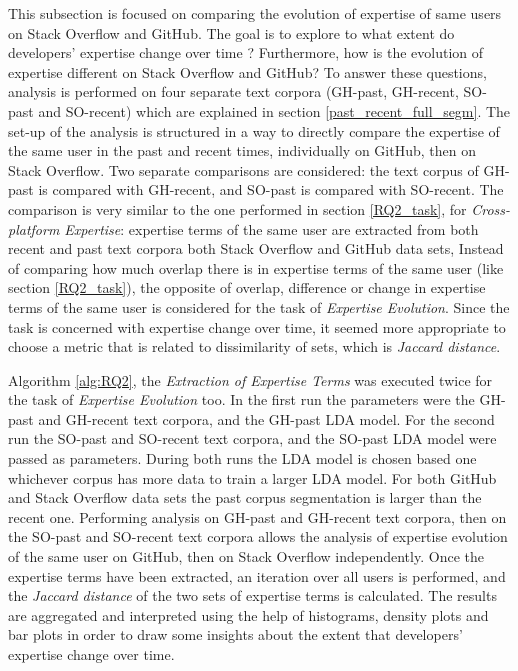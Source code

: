         This subsection is focused on comparing the evolution of expertise of same users on Stack Overflow and GitHub. The goal is to explore to what extent do developers' expertise change over time ? Furthermore, how is the evolution of expertise different on Stack Overflow and GitHub? To answer these questions, analysis is performed on four separate text corpora (GH-past, GH-recent, SO-past and SO-recent) which are explained in section \ref{past_recent_full_segm}. The set-up of the analysis is structured in a way to directly compare the expertise of the same user in the past and recent times, individually on GitHub, then on Stack Overflow. Two separate comparisons are considered: the text corpus of GH-past is compared with GH-recent, and SO-past is compared with SO-recent. The comparison is very similar to the one performed in section \ref{RQ2_task}, for \emph{Cross-platform Expertise}: expertise terms of the same user are extracted from both recent and past text corpora both Stack Overflow and GitHub data sets, Instead of comparing how much overlap there is in expertise terms of the same user (like section \ref{RQ2_task}), the opposite of overlap, difference or change in expertise terms of the same user is considered for the task of \emph{Expertise Evolution}. Since the task is concerned with expertise change over time, it seemed more appropriate to choose a metric that is related to dissimilarity of sets, which is  \emph{Jaccard distance}.
        
        Algorithm \ref{alg:RQ2}, the \emph{Extraction of Expertise Terms} was executed twice for the task of \emph{Expertise Evolution} too. In the first run the parameters were the GH-past and GH-recent text corpora, and the GH-past LDA model. For the second run the SO-past and SO-recent text corpora, and the SO-past LDA model were passed as parameters. During both runs the LDA model is chosen based one whichever corpus has more data to train a larger LDA model. For both GitHub and Stack Overflow data sets the past corpus segmentation is larger than the recent one. Performing analysis on GH-past and GH-recent text corpora, then on the SO-past and SO-recent text corpora allows the analysis of expertise evolution of the same user on GitHub, then on Stack Overflow independently. Once the expertise terms have been extracted, an iteration over all users is performed, and the \emph{Jaccard distance} of the two sets of expertise terms is calculated. The results are aggregated and interpreted using the help of histograms, density plots and bar plots in order to draw some insights about the extent that developers' expertise change over time.

